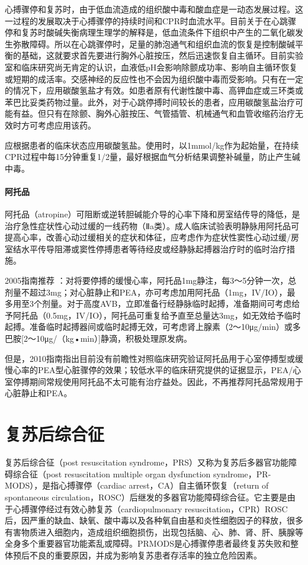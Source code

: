 心搏骤停和复苏时，由于低血流造成的组织酸中毒和酸血症是一动态发展过程。这一过程的发展取决于心搏骤停的持续时间和CPR时血流水平。目前关于在心跳骤停和复苏时酸碱失衡病理生理学的解释是，低血流条件下组织中产生的二氧化碳发生弥散障碍。所以在心跳骤停时，足量的肺泡通气和组织血流的恢复是控制酸碱平衡的基础，这就要求首先要进行胸外心脏按压，然后迅速恢复自主循环。目前实验室和临床研究尚无肯定的认识，血液低pH会影响除颤成功率、影响自主循环恢复或短期的成活率。交感神经的反应性也不会因为组织酸中毒而受影响。只有在一定的情况下，应用碳酸氢盐才有效。如患者原有代谢性酸中毒、高钾血症或三环类或苯巴比妥类药物过量。此外，对于心跳停搏时间较长的患者，应用碳酸氢盐治疗可能有益。但只有在除颤、胸外心脏按压、气管插管、机械通气和血管收缩药治疗无效时方可考虑应用该药。

应根据患者的临床状态应用碳酸氢盐。使用时，以1mmol/kg作为起始量，在持续CPR过程中每15分钟重复1/2量，最好根据血气分析结果调整补碱量，防止产生碱中毒。

\paragraph{阿托品}

阿托品（atropine）可阻断或逆转胆碱能介导的心率下降和房室结传导的降低，是治疗急性症状性心动过缓的一线药物（Ⅱa类）。成人临床试验表明静脉用阿托品可提高心率，改善心动过缓相关的症状和体征，应考虑作为症状性窦性心动过缓/房室结水平传导阻滞或窦性停搏患者等待经皮或经静脉起搏器治疗时的临时治疗措施。

2005指南推荐
：对将要停搏的缓慢心率，阿托品1mg静注，每3～5分钟一次，总剂量不超过3mg；对心脏静止和PEA，亦可考虑加用阿托品（1mg，IV/IO），最多用至3个剂量。对于高度AVB，立即准备行经静脉临时起搏，准备期间可考虑给予阿托品（0.5mg，IV/IO），阿托品可重复给予直至总量达3mg，如无效给予临时起搏。准备临时起搏器间或临时起搏无效，可考虑肾上腺素（2～10μg/min）或多巴胺{[}2～10μg/（kg•min）{]}静滴，积极处理原发病。

但是，2010指南指出目前没有前瞻性对照临床研究验证阿托品用于心室停搏型或缓慢心率的PEA型心脏骤停的效果；较低水平的临床研究提供的证据显示，PEA/心室停搏期间常规使用阿托品不太可能有治疗益处。因此，不再推荐阿托品常规用于心脏静止和PEA。

\protect\hypertarget{text00286.html}{}{}

\section{复苏后综合征}

复苏后综合征（post resuscitation
syndrome，PRS）又称为复苏后多器官功能障碍综合征（post resuscitation
multiple organ dysfunction syndrome，PR-MODS），是指心搏骤停（cardiac
arrest，CA）自主循环恢复（return of spontaneous
circulation，ROSC）后继发的多器官功能障碍综合征。它主要是由于心搏骤停经过有效心肺复苏（cardiopulmonary
resuscitation，CPR）ROSC后，因严重的缺血、缺氧、酸中毒以及各种氧自由基和炎性细胞因子的释放，很多有害物质进入细胞内，造成组织细胞损伤，出现包括脑、心、肺、肾、肝、胰腺等全身多个重要器官功能紊乱或障碍。PRMODS是心搏骤停患者最终复苏失败和整体预后不良的重要原因，并成为影响复苏患者存活率的独立危险因素。

